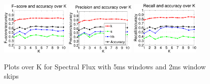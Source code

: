 \begin{figure}


	\centering\includegraphics[width=0.3\textwidth]{tex/appendices/test/sflux52FP.png}
	\centering\includegraphics[width=0.3\textwidth]{tex/appendices/test/sflux52_P.png}
	\centering\includegraphics[width=0.3\textwidth]{tex/appendices/test/sflux52_R.png}
		
		\caption{Plots over K for Spectral Flux with 5ms windows and 2ms window skips}
\end{figure}

